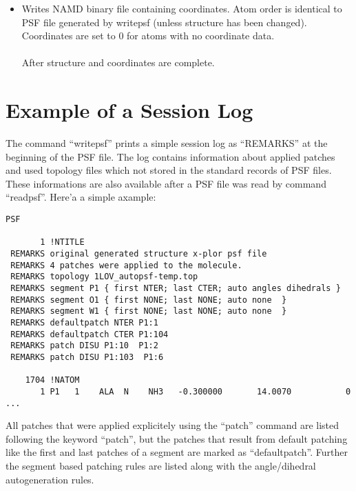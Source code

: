 \begin{itemize}
\item {}
{Writes NAMD binary file containing coordinates.  Atom order is identical to
PSF file generated by writepsf (unless structure has been changed).
Coordinates are set to 0 for atoms with no coordinate data.}
{\\
\\
}
{After structure and coordinates are complete.}

\end{itemize}

\section{Example of a Session Log}
The command  ``writepsf'' prints a simple session log as ``REMARKS'' 
at the beginning of the PSF file. The log contains information about applied patches 
and used topology files which not stored in the standard records of PSF files.
These informations are also available after a PSF file was read by command ``readpsf''.
Here'a a simple axample:

\begin{verbatim}
PSF

       1 !NTITLE
 REMARKS original generated structure x-plor psf file
 REMARKS 4 patches were applied to the molecule.
 REMARKS topology 1LOV_autopsf-temp.top
 REMARKS segment P1 { first NTER; last CTER; auto angles dihedrals }
 REMARKS segment O1 { first NONE; last NONE; auto none  }
 REMARKS segment W1 { first NONE; last NONE; auto none  }
 REMARKS defaultpatch NTER P1:1
 REMARKS defaultpatch CTER P1:104
 REMARKS patch DISU P1:10  P1:2
 REMARKS patch DISU P1:103  P1:6

    1704 !NATOM
       1 P1   1    ALA  N    NH3   -0.300000       14.0070           0
...
\end{verbatim}

All patches that were applied explicitely using the ``patch'' command are 
listed following the keyword  ``patch'', but the patches that
result from default patching like the first and last patches of a segment 
are marked as ``defaultpatch''. Further the segment based patching rules are
listed along with the angle/dihedral autogeneration rules.
